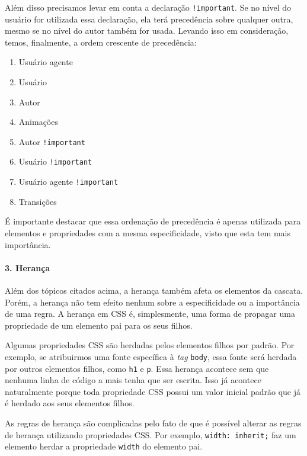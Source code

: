 Além disso precisamos levar em conta a declaração \texttt{!important}.
Se no nível do usuário for utilizada essa declaração, ela terá
precedência sobre qualquer outra, mesmo se no nível do autor também for
usada. Levando isso em consideração, temos, finalmente, a ordem
crescente de precedência:

\begin{enumerate}
\def\labelenumi{\arabic{enumi}.}
\tightlist
\item
  Usuário agente
\item
  Usuário
\item
  Autor
\item
  Animações
\item
  Autor \texttt{!important}
\item
  Usuário \texttt{!important}
\item
  Usuário agente \texttt{!important}
\item
  Transições
\end{enumerate}

É importante destacar que essa ordenação de precedência é apenas
utilizada para elementos e propriedades com a mesma especificidade,
visto que esta tem mais importância.

\hypertarget{heranuxe7a}{%
\paragraph{3. Herança}\label{heranuxe7a}}

Além dos tópicos citados acima, a herança também afeta os elementos da
cascata. Porém, a herança não tem efeito nenhum sobre a especificidade
ou a importância de uma regra. A herança em CSS é, simplesmente, uma
forma de propagar uma propriedade de um elemento pai para os seus
filhos.

Algumas propriedades CSS são herdadas pelos elementos filhos por padrão.
Por exemplo, se atribuirmos uma fonte específica à \emph{tag}
\texttt{body}, essa fonte será herdada por outros elementos filhos, como
\texttt{h1} e \texttt{p}. Essa herança acontece sem que nenhuma linha de
código a mais tenha que ser escrita. Isso já acontece naturalmente
porque toda propriedade CSS possui um valor inicial padrão que já é
herdado aos seus elementos filhos.

As regras de herança são complicadas pelo fato de que é possível
alterar as regras de herança utilizando propriedades CSS. Por exemplo,
\texttt{width:\ inherit;} faz um elemento herdar a propriedade
\texttt{width} do elemento pai.

